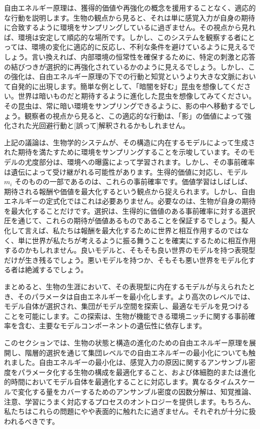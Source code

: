\documentclass{article}
\begin{document}
自由エネルギー原理は、獲得的価値や再強化の概念を援用することなく、適応的な行動を説明します。生物の観点から見ると、それは単に感覚入力が自身の期待に合致するように環境をサンプリングしているに過ぎません。その視点から見れば、環境は安定して順応的な場所です。しかし、このシステムを観察する者にとっては、環境の変化に適応的に反応し、不利な条件を避けているように見えるでしょう。言い換えれば、内部環境の恒常性を確保するために、特定の刺激と応答の結びつきが選択的に再強化されているかのように見えるでしょう。しかし、この強化は、自由エネルギー原理の下での行動と知覚というより大きな文脈において自発的に出現します。簡単な例として、「暗闇を好む」昆虫を想像してください。世界は暗いものだと期待するように進化した昆虫を想像してみてください。その昆虫は、常に暗い環境をサンプリングできるように、影の中へ移動するでしょう。観察者の視点から見ると、この適応的な行動は、「影」の価値によって強化された光回避行動と[誤って]解釈されるかもしれません。

上記の議論は、生物学的システムが、その構造に内在するモデルによって生成された期待を満たすために環境をサンプリングすることを示唆しています。そのモデルの尤度部分は、環境への曝露によって学習されます。しかし、その事前確率は遺伝によって受け継がれる可能性があります。生得的価値に対応し、モデル $m_i$ そのものの一部であるのは、これらの事前確率です。価値学習はしばしば、期待される報酬や価値を最大化するという観点から捉えられます。しかし、自由エネルギーの定式化ではこれは必要ありません。必要なのは、生物が自身の期待を最大化することだけです。選択は、生得的に価値のある事前確率に対する選択圧を通じて、これらの期待が価値あるものであることを保証するでしょう。擬人化して言えば、私たちは報酬を最大化するために世界と相互作用するのではなく、単に世界が私たちが考えるように振る舞うことを確実にするために相互作用するのかもしれません。良いモデルと、そもそも良い世界のモデルを持つ表現型だけが生き残るでしょう。悪いモデルを持つか、そもそも悪い世界をモデル化する者は絶滅するでしょう。

まとめると、生物の生涯において、その表現型に内在するモデルが与えられたとき、そのパラメータは自由エネルギーを最小化します。より高次のレベルでは、モデル自体が選択され、集団がモデル空間を探索し、最適なモデルを見つけることを可能にします。この探索は、生物が機能できる環境ニッチに関する事前確率を含む、主要なモデルコンポーネントの遺伝性に依存します。

このセクションでは、生物の状態と構造の進化のための自由エネルギー原理を展開し、階層的選択を通じて集団レベルでの自由エネルギーの最小化についても触れました。自由エネルギーの最小化は、感覚入力の原因に関するアンサンブル密度をパラメータ化する生物の構成を最適化すること、および体細胞的または進化的時間においてモデル自体を最適化することに対応します。異なるタイムスケールで変化する量をカバーするためのアンサンブル密度の因数分解は、知覚推論、注意、学習にうまく対応するプロセスのオントロジーを提供します。もちろん、私たちはこれらの問題にやや表面的に触れたに過ぎません。それぞれが十分に扱われるべきです。
\end{document}
